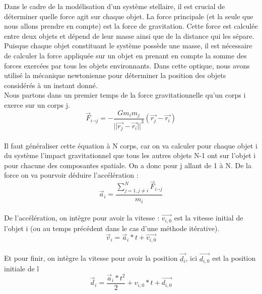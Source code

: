 \documentclass[11pt]{article}
\begin{document}
Dans le cadre de la modélisation d'un système stellaire, il est crucial de déterminer quelle force agit sur chaque objet. La force principale (et la seule que nous allons prendre en compte) est la force de gravitation. Cette force est calculée entre deux objets et dépend de leur masse ainsi que de la distance qui les sépare. Puisque chaque objet constituant le système possède une masse, il est nécessaire de calculer la force appliquée sur un objet en prenant en compte la somme des forces exercées par tous les objets environnants. Dans cette optique, nous avons utilisé la mécanique newtonienne pour déterminer la position des objets considérés à un instant donné.
\\[2 mm]
Nous partons dans un premier temps de la force gravitationnelle qu'un corps i exerce sur un corps j.
\\[2 mm]
\begin{equation}
\overrightarrow{F}_{i\overrightarrow{}j} = - \frac{G m_{i}m_{j}}{{||\overrightarrow{r_{j}}-\overrightarrow{r_{i}}||}^3}{(\overrightarrow{r_{j}}-\overrightarrow{r_{i}})}
\end{equation}
\\[2 mm]
Il faut généraliser cette équation à N corps, car on va calculer pour chaque objet i du système l'impact gravitationnel que tous les autres objets N-1 ont sur l'objet i pour chacune des composantes spatiale. On a donc pour j allant de 1 à N. De la force on va pourvoir déduire l'accélération :
\\[2 mm]
\begin{equation}
\overrightarrow{a}_{i} =\frac{\sum^{N}_{j=1,j \neq i}\overrightarrow{F}_{i\overrightarrow{}{j}}}{m_{i}}
\end{equation}
\\[2 mm]
De l'accélération, on intègre pour avoir la vitesse : \(\overrightarrow{v_{i,0}}\) est la vitesse initial de l'objet i (ou au temps précédent dans le cas d'une méthode itérative).
\\[2 mm]
\begin{equation}
\overrightarrow{v}_{i} = \overrightarrow{a}_{i}*t + \overrightarrow{v_{i,0}}
\end{equation}
\\[2 mm]
Et pour finir, on intègre la vitesse pour avoir la position \(\overrightarrow{d_{i}}\), ici \(\overrightarrow{d_{i,0}}\) est la position initiale de l
\\[2 mm]
\begin{equation}
\overrightarrow{d}_{i} = \frac{\overrightarrow{a}_{i}*t^{2}}{2} + v_{i,0}*t + \overrightarrow{d_{i,0}}
\end{equation}
\\[2 mm]
\end{document}

